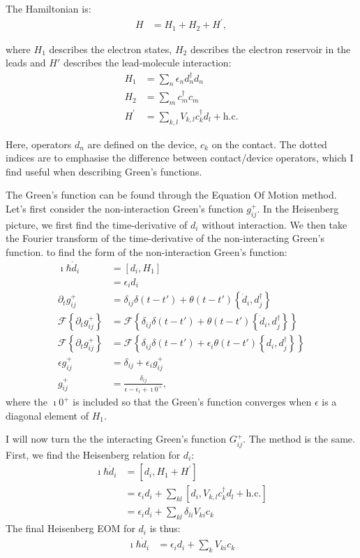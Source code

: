 The Hamiltonian is:
\begin{align}
H &= H_1 + H_2 + H^\prime, \label{eq:hamiltonian}
\end{align}

where $H_1$ describes the electron states, $H_2$ describes the electron reservoir in the leads and $H'$ describes the lead-molecule interaction:
\begin{align*}
H_1 &= \sum_n \epsilon_n d^\dagger_n d_n \\
H_2 &= \sum_{m} c^\dagger_{m} c_{m} \\
H^\prime &= \sum_{k, l} V_{k, l} c^\dagger_{k} d_l + \text{h.c.}
\end{align*}

Here, operators $d_n$ are defined on the device, $c_{k}$ on the contact. The dotted indices are to emphasise the difference between contact/device operators, which I find useful when describing Green's functions. 

The Green's function can be found through the Equation Of Motion method. Let's first consider the non-interaction Green's function $g_{ij}^+$. In the Heisenberg picture, we first find the time-derivative of $d_i$ without interaction. We then take the Fourier transform of the time-derivative of the non\hyp{}interacting Green's function. to find the form of the non-interaction Green's function:
\begin{align*}
\imath \hbar \dot{d}_i &= \left[d_i, H_1\right] \\
&= \epsilon_i d_i \\
\partial_t g_{ij}^+ &= \delta_{ij} \delta(t-t') + \theta(t-t')\left\{ \dot{d}_i, d_j^\dagger\right\} \\
\mathscr{F}\left\{\partial_t g_{ij}^+ \right\}&= \mathscr{F}\left\{\delta_{ij} \delta(t-t') + \theta(t-t')\left\{ \dot{d}_i, d_j^\dagger\right\}\right\} \\
\mathscr{F}\left\{\partial_t g_{ij}^+ \right\}&= \mathscr{F}\left\{\delta_{ij} \delta(t-t') +\epsilon_i \theta(t-t')\left\{ d_i, d_j^\dagger\right\}\right\} \\ 
\epsilon g_{ij}^+ &= \delta_{ij} + \epsilon_i g_{ij}^+ \\
g_{ij}^+ &= \frac{ \delta_{ij} }{ \epsilon - \epsilon_i + \imath 0^+},
\end{align*}
where the $\imath 0^+$ is included so that the Green's function converges when $\epsilon$ is a diagonal element of $H_1$.

I will now turn the the interacting Green's function $G_{ij}^+$. The method is the same.
First, we find the Heisenberg relation for $d_i$:
\begin{align*}
\imath \hbar \dot{d}_i &= \left[ d_i, H_1 + H^\prime\right] \\
&=\epsilon_i d_i + \sum_{kl}\left[d_i, V_{k, l} c^\dagger_{k} d_l + \text{h.c.}\right] \\
&=\epsilon_i d_i + \sum_{kl}\delta_{li} V_{ki} c_{k}
\end{align*}
The final Heisenberg EOM for $d_i$ is thus:
\begin{align}
\imath \hbar \dot{d}_i &= \epsilon_i d_i + \sum_{k}V_{ki} c_{k} \label{eq:heisenbergdotd}
\end{align}

